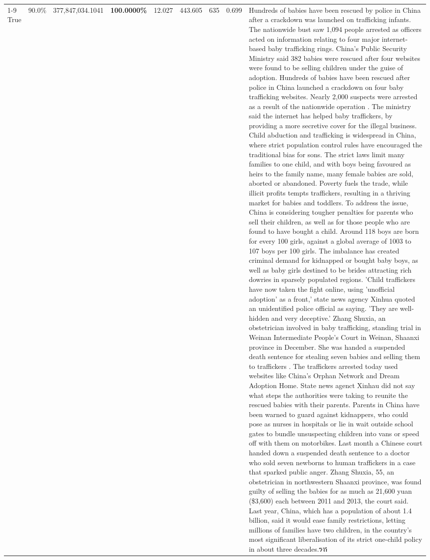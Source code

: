 \begin{table}[H]
\begin{tabular}{lllrlllll}
\cline{1-9}
True & 90.0\% & 377,847,034.1041 & \bfseries \color{red} 100.0000\% & 12.027 & 443.605 & 635 & 0.699 & Hundreds of babies have been rescued by police in China after a crackdown was launched on trafficking infants. The nationwide bust saw 1,094 people arrested as officers acted on information relating to four major internet-based baby trafficking rings. China's Public Security Ministry said 382 babies were rescued after four websites were found to be selling children under the guise of adoption. Hundreds of babies have been rescued after police in China launched a crackdown on four baby trafficking websites. Nearly 2,000 suspects were arrested as a result of the nationwide operation . The ministry said the internet has helped baby traffickers, by providing a more secretive cover for the illegal business. Child abduction and trafficking is widespread in China, where strict population control rules have encouraged the traditional bias for sons. The strict laws limit many families to one child, and with boys being favoured as heirs to the family name, many female babies are sold, aborted or abandoned. Poverty fuels the trade, while illicit profits tempts traffickers, resulting in a thriving market for babies and toddlers. To address the issue, China is considering tougher penalties for parents who sell their children, as well as for those people who are found to have bought a child. Around 118 boys are born for every 100 girls, against a global average of 1003 to 107 boys per 100 girls. The imbalance has created criminal demand for kidnapped or bought baby boys, as well as baby girls destined to be brides attracting rich dowries in sparsely populated regions. 'Child traffickers have now taken the fight online, using 'unofficial adoption' as a front,' state news agency Xinhua quoted an unidentified police official as saying. 'They are well-hidden and very deceptive.' Zhang Shuxia, an obstetrician involved in baby trafficking, standing trial in Weinan Intermediate People's Court in Weinan, Shaanxi province in December. She was handed a suspended death sentence for stealing seven babies and selling them to traffickers . The traffickers arrested today used websites like China's Orphan Network and Dream Adoption Home. State news agenct Xinhau did not say what steps the authorities were taking to reunite the rescued babies with their parents. Parents in China have been warned to guard against kidnappers, who could pose as nurses in hospitals or lie in wait outside school gates to bundle unsuspecting children into vans or speed off with them on motorbikes. Last month a Chinese court handed down a suspended death sentence to a doctor who sold seven newborns to human traffickers in a case that sparked public anger. Zhang Shuxia, 55, an obstetrician in northwestern Shaanxi province, was found guilty of selling the babies for as much as 21,600 yuan (\$3,600) each between 2011 and 2013, the court said. Last year, China, which has a population of about 1.4 billion, said it would ease family restrictions, letting millions of families have two children, in the country's most significant liberalisation of its strict one-child policy in about three decades.ንሽ \\

\end{tabular}
\end{table}
